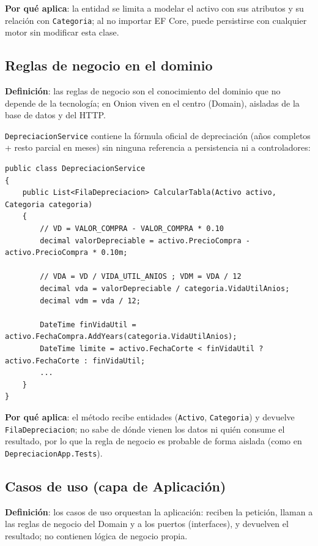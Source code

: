 \documentclass[11pt,a4paper]{article}
\begin{document}
\textbf{Por qué aplica}: la entidad se limita a modelar el activo con sus
atributos y su relación con \texttt{Categoria}; al no importar EF Core, puede
persistirse con cualquier motor sin modificar esta clase.

\subsection{Reglas de negocio en el dominio}

\textbf{Definición}: las reglas de negocio son el conocimiento del dominio que
no depende de la tecnología; en Onion viven en el centro (Domain), aisladas de
la base de datos y del HTTP.

\texttt{DepreciacionService} contiene la fórmula oficial de depreciación
(años completos + resto parcial en meses) sin ninguna referencia a
persistencia ni a controladores:

\begin{lstlisting}[style=csharp, caption={AssetsService.Domain/Services/DepreciacionService.cs (fragmento)}]
public class DepreciacionService
{
    public List<FilaDepreciacion> CalcularTabla(Activo activo, Categoria categoria)
    {
        // VD = VALOR_COMPRA - VALOR_COMPRA * 0.10
        decimal valorDepreciable = activo.PrecioCompra - activo.PrecioCompra * 0.10m;

        // VDA = VD / VIDA_UTIL_ANIOS ; VDM = VDA / 12
        decimal vda = valorDepreciable / categoria.VidaUtilAnios;
        decimal vdm = vda / 12;

        DateTime finVidaUtil = activo.FechaCompra.AddYears(categoria.VidaUtilAnios);
        DateTime limite = activo.FechaCorte < finVidaUtil ? activo.FechaCorte : finVidaUtil;
        ...
    }
}
\end{lstlisting}

\textbf{Por qué aplica}: el método recibe entidades (\texttt{Activo},
\texttt{Categoria}) y devuelve \texttt{FilaDepreciacion}; no sabe de dónde
vienen los datos ni quién consume el resultado, por lo que la regla de negocio
es probable de forma aislada (como en \texttt{DepreciacionApp.Tests}).

\subsection{Casos de uso (capa de Aplicación)}

\textbf{Definición}: los casos de uso orquestan la aplicación: reciben la
petición, llaman a las reglas de negocio del Domain y a los puertos
(interfaces), y devuelven el resultado; no contienen lógica de negocio propia.
\end{document}
